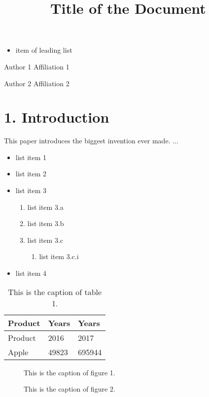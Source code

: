 \documentclass[11pt,a4paper]{article}
\title{Title of the Document}
\begin{document}
\maketitle

\begin{itemize}
\item item of leading list
\end{itemize}

Author 1
Affiliation 1

Author 2
Affiliation 2

\section{1. Introduction}

This paper introduces the biggest invention ever made. ...

\begin{itemize}
\item list item 1
\item list item 2
\item list item 3
  \begin{enumerate}
\item list item 3.a
\item list item 3.b
\item list item 3.c
    \begin{enumerate}
\item list item 3.c.i
    \end{enumerate}
  \end{enumerate}
\item list item 4
\end{itemize}

\begin{table}[h]
\caption{This is the caption of table 1.}
\begin{tabular}{|l|l|l|}
\hline
Product & Years & Years \\ \hline
Product & 2016 & 2017 \\ \hline
Apple & 49823 & 695944 \\ \hline
\end{tabular}
\end{table}

\begin{figure}[h]
\caption{This is the caption of figure 1.}
\end{figure}

\begin{figure}[h]
\caption{This is the caption of figure 2.}
\end{figure}
\end{document}
